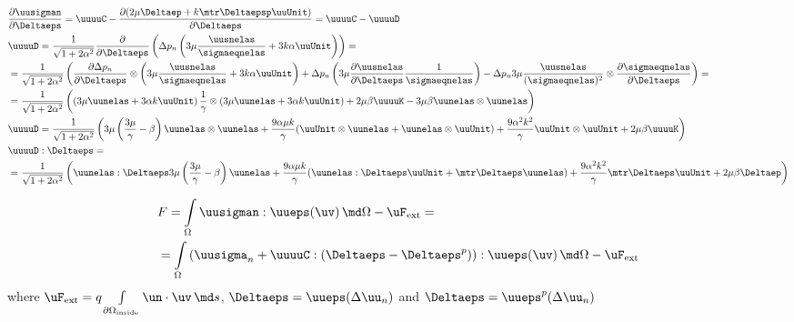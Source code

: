 \documentclass[12pt]{article}
\begin{document}
\begin{align}
    & \frac{\partial\uusigman}{\partial \Deltaeps} = \uuuuC - \frac{\partial (2\mu\Deltaep + k\mtr\Deltaepsp\uuUnit)}{\partial\Deltaeps} = \uuuuC - \uuuuD \\
    & \uuuuD = \frac{1}{\sqrt{1 + 2\alpha^2}} \frac{\partial }{\partial \Deltaeps} \left( \Delta p_n \left( 3\mu \frac{\uusnelas}{\sigmaeqnelas} + 3k\alpha \uuUnit  \right) \right) = \\
    & = \frac{1}{\sqrt{1 + 2\alpha^2}}\left( \frac{\partial\Delta p_n}{\partial\Deltaeps} \otimes \left( 3\mu\frac{\uusnelas}{\sigmaeqnelas} + 3k\alpha \uuUnit \right) + \Delta p_n \left(3\mu\frac{\partial\uusnelas}{\partial\Deltaeps}\frac{1}{\sigmaeqnelas} \right) - \Delta p_n 3\mu\frac{\uusnelas}{(\sigmaeqnelas)^2} \otimes \frac{\partial\sigmaeqnelas}{\partial\Deltaeps}\right) = \\
    & = \frac{1}{\sqrt{1 + 2\alpha^2}}\left( \left( 3\mu \uunelas + 3\alpha k \uuUnit \right) \frac{1}{\gamma} \otimes \left( 3\mu \uunelas + 3\alpha k \uuUnit \right) + 2\mu\beta\uuuuK - 3\mu\beta\uunelas \otimes \uunelas \right) \\
    & \uuuuD = \frac{1}{\sqrt{1 + 2\alpha^2}}\left( 3\mu\left(\frac{3\mu}{\gamma} - \beta\right)\uunelas \otimes \uunelas + \frac{9\alpha\mu k}{\gamma} (\uuUnit \otimes \uunelas + \uunelas \otimes \uuUnit) + \frac{9\alpha^2k^2}{\gamma} \uuUnit \otimes \uuUnit + 2\mu\beta \uuuuK \right) \\
    & \uuuuD : \Deltaeps = \\
    & = \frac{1}{\sqrt{1 + 2\alpha^2}}\left( \uunelas : \Deltaeps 3\mu \left( \frac{3\mu}{\gamma} - \beta \right) \uunelas + \frac{9\alpha\mu k}{\gamma} (\uunelas : \Deltaeps \uuUnit + \mtr\Deltaeps \uunelas) + \frac{9\alpha^2k^2}{\gamma} \mtr \Deltaeps \uuUnit + 2\mu\beta \Deltaep \right)  \\
\end{align}

\begin{align}
    & F = \int\limits_\Omega \uusigman : \uueps(\uv) \, \md\Omega - \uF_\text{ext} = \\ 
    & = \int\limits_\Omega \left( \uusigma_n + \uuuuC : (\Deltaeps - \Deltaeps^p) \right) : \uueps(\uv) \, \md\Omega - \uF_\text{ext} 
\end{align}
where $\uF_\text{ext} = q \int\limits_{\partial\Omega_\text{inside}}\un \cdot \uv \, \md s $, $\Deltaeps = \uueps(\Delta\uu_n)$ and $\Deltaeps = \uueps^p(\Delta\uu_n)$
\end{document}

